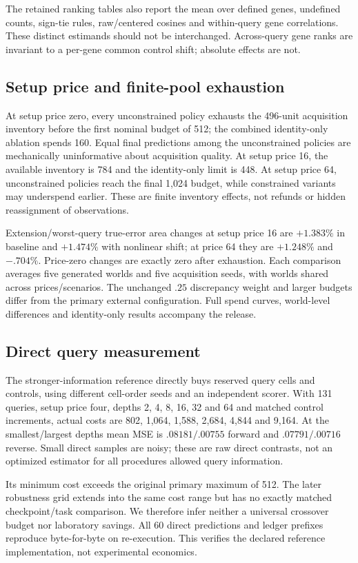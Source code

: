 The retained ranking tables also report the mean over defined genes, undefined counts, sign-tie rules, raw/centered cosines and within-query gene correlations. These distinct estimands should not be interchanged. Across-query gene ranks are invariant to a per-gene common control shift; absolute effects are not.

\subsection{Setup price and finite-pool exhaustion}
At setup price zero, every unconstrained policy exhausts the 496-unit acquisition inventory before the first nominal budget of 512; the combined identity-only ablation spends 160. Equal final predictions among the unconstrained policies are mechanically uninformative about acquisition quality. At setup price 16, the available inventory is 784 and the identity-only limit is 448. At setup price 64, unconstrained policies reach the final 1,024 budget, while constrained variants may underspend earlier. These are finite inventory effects, not refunds or hidden reassignment of observations.

Extension/worst-query true-error area changes at setup price 16 are $+1.383\%$ in baseline and $+1.474\%$ with nonlinear shift; at price 64 they are $+1.248\%$ and $-.704\%$. Price-zero changes are exactly zero after exhaustion. Each comparison averages five generated worlds and five acquisition seeds, with worlds shared across prices/scenarios. The unchanged $.25$ discrepancy weight and larger budgets differ from the primary external configuration. Full spend curves, world-level differences and identity-only results accompany the release.

\subsection{Direct query measurement}
The stronger-information reference directly buys reserved query cells and controls, using different cell-order seeds and an independent scorer. With 131 queries, setup price four, depths 2, 4, 8, 16, 32 and 64 and matched control increments, actual costs are 802, 1,064, 1,588, 2,684, 4,844 and 9,164. At the smallest/largest depths mean MSE is $.08181/.00755$ forward and $.07791/.00716$ reverse. Small direct samples are noisy; these are raw direct contrasts, not an optimized estimator for all procedures allowed query information.

Its minimum cost exceeds the original primary maximum of 512. The later robustness grid extends into the same cost range but has no exactly matched checkpoint/task comparison. We therefore infer neither a universal crossover budget nor laboratory savings. All 60 direct predictions and ledger prefixes reproduce byte-for-byte on re-execution. This verifies the declared reference implementation, not experimental economics.
